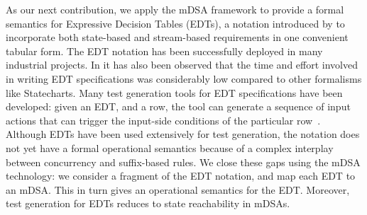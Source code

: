  As our next contribution, we apply the mDSA framework to provide a formal semantics for Expressive Decision Tables (EDTs), a notation introduced by \cite{DBLP:conf/date/VenkateshSKA14} to incorporate both state-based and stream-based requirements in one convenient tabular form. The EDT notation has been successfully deployed in many industrial projects. In \cite{DBLP:conf/date/VenkateshSKA14} it has also been observed that the time and effort involved in writing EDT specifications was considerably low compared to other formalisms like  Statecharts. Many test generation tools for EDT specifications have been developed: given an EDT, and a row, the tool can generate a sequence of input actions that can trigger the input-side conditions of the particular row~\cite{DBLP:conf/enase/VenkateshSZA15a,DBLP:conf/icst/AgrawalVSZV20}. %
  Although EDTs have been used extensively for test generation, the notation does not yet have a formal operational semantics because of a complex interplay between concurrency and suffix-based rules. We close these gaps using the mDSA technology: we consider a fragment of the EDT notation, and map each EDT to an mDSA. This in turn gives an operational semantics for the EDT. Moreover, test generation for EDTs reduces to state reachability in mDSAs. 
  
  
  
  

  

  
  



